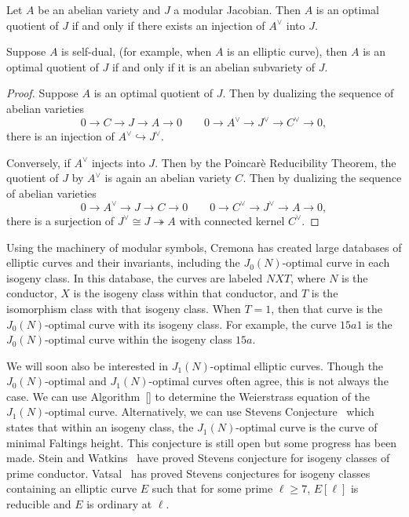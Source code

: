 \documentclass[11pt, proquest]{uwthesis}
\begin{document}
\begin{proposition}
    \label{prop:optimal}
    Let $A$ be an abelian variety and $J$ a modular Jacobian. Then $A$ is an
    optimal quotient of $J$ if and only if there exists an injection of
    $A^\vee$ into $J$.

    Suppose $A$ is self-dual, (for example, when $A$ is an elliptic curve), then
    $A$ is an optimal quotient of $J$ if and only if it is an abelian
    subvariety of $J$.
\end{proposition}
\begin{proof}
    Suppose $A$ is an optimal quotient of $J$. Then by dualizing the sequence
    of abelian varieties~\cite[Proposition 2.4.2]{lange-birkenhake:complex}
    \[
        0 \to C \to J \to A \to 0 \qquad 
        0\to A^\vee \to J^\vee \to C^\vee \to 0,
    \]
    there is an injection of $A^\vee\hookrightarrow J^\vee$.

    Conversely, if $A^\vee$ injects into $J$. Then by the Poincar\`{e} Reducibility
    Theorem, the quotient of $J$ by $A^\vee$ is again an abelian variety $C$.
    Then by dualizing the sequence of abelian varieties
    \[
        0 \to A^\vee \to J \to C \to 0 \qquad 
        0 \to C^\vee \to J^\vee \to A \to 0,
    \]
    there is a surjection of $J^\vee\cong J\twoheadrightarrow A$ with connected
    kernel $C^\vee$.
\end{proof}

Using the machinery of modular symbols, Cremona has created large databases of
elliptic curves and their invariants, including the $J_0(N)$-optimal curve in
each isogeny class. In this database, the curves are labeled $NXT$, where $N$
is the conductor, $X$ is the isogeny class within that conductor, and $T$ is
the isomorphism class with that isogeny class. When $T=1$, then that curve is
the $J_0(N)$-optimal curve with its isogeny class. For example, the curve
$15a1$ is the $J_0(N)$-optimal curve within the isogeny class $15a$.

We will soon also be interested in $J_1(N)$-optimal elliptic curves. Though the
$J_0(N)$-optimal and $J_1(N)$-optimal curves often agree, this is not always
the case. We can use Algorithm~\ref{} to determine the Weierstrass equation of
the $J_1(N)$-optimal curve. Alternatively, we can use Stevens
Conjecture~\cite[Conjecture II]{stevens:param} which states that within an
isogeny class, the $J_1(N)$-optimal curve is the curve of minimal Faltings
height. This conjecture is still open but some progress has been made. Stein
and Watkins~\cite[\S 3]{stein-watkins:ns} have proved Stevens conjecture for
isogeny classes of prime conductor. Vatsal~\cite[Thm.
1.11]{vatsal:multiplicative} has proved Stevens conjectures for isogeny classes
containing an elliptic curve $E$ such that for some prime $\ell\geq 7$,
$E[\ell]$ is reducible and $E$ is ordinary at $\ell$.
\end{document}
